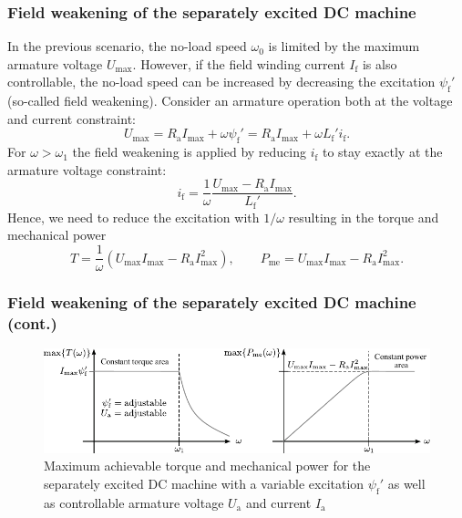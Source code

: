 \begin{frame}
	\frametitle{Field weakening of the separately excited DC machine}
			In the previous scenario, the no-load speed $\omega_0$ is limited by the maximum armature voltage $U_\mathrm{max}$. However, if the field winding current $I_\mathrm{f}$ is also controllable, the no-load speed can be increased by decreasing the excitation $\psi_\mathrm{f}'$ (so-called field weakening). Consider an armature operation both at the voltage and current constraint:
			\begin{equation}
				U_\mathrm{max}  = R_\mathrm{a} I_\mathrm{max} + \omega \psi_\mathrm{f}'= R_\mathrm{a} I_\mathrm{max} + \omega L_\mathrm{f}' i_\mathrm{f}.
			\end{equation}
			For $\omega > \omega_1$ the field weakening is applied by reducing $i_\mathrm{f}$ to stay exactly at the armature voltage constraint:
			\begin{equation}
				i_\mathrm{f} = \frac{1}{\omega}\frac{U_\mathrm{max} - R_\mathrm{a} I_\mathrm{max}}{L_\mathrm{f}'}.
			\end{equation}
			Hence, we need to reduce the excitation with $1/\omega$ resulting in the torque and mechanical power
			\begin{equation}
				T = \frac{1}{\omega} \left(U_\mathrm{max}I_\mathrm{max} - R_\mathrm{a} I_\mathrm{max}^2\right), \qquad P_\mathrm{me} = U_\mathrm{max}I_\mathrm{max} - R_\mathrm{a} I_\mathrm{max}^2.
			\end{equation}
\end{frame}

\begin{frame}
	\frametitle{Field weakening of the separately excited DC machine (cont.)}
	\begin{figure}
		\centering
		\includegraphics[scale=1.1]{fig/lec03/Sep_DC_machine_field_weakening.pdf}
		\caption{Maximum achievable torque and mechanical power for the separately excited DC machine with a variable excitation $\psi_\mathrm{f}'$ as well as controllable armature voltage $U_\mathrm{a}$ and current $I_\mathrm{a}$}
		\label{fig:Sep_DC_machine_field_weakening}
\end{figure}
\end{frame}

